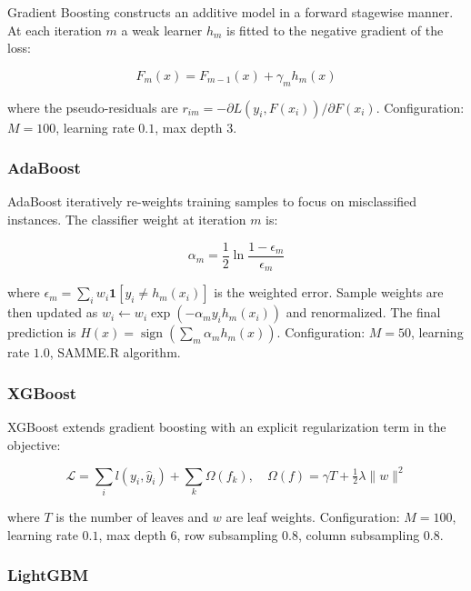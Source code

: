 \documentclass[10pt,letterpaper]{article}
\begin{document}
Gradient Boosting constructs an additive model in a forward stagewise manner. At each iteration $m$
a weak learner $h_m$ is fitted to the negative gradient of the loss:

\begin{equation}
    F_m(x) = F_{m-1}(x) + \gamma_m h_m(x)
    \label{eq:gbm}
\end{equation}

where the pseudo-residuals are $r_{im} = -\partial L(y_i, F(x_i)) / \partial F(x_i)$.
Configuration: $M=100$, learning rate $0.1$, max depth $3$.

\subsubsection{AdaBoost~\cite{freund1997}}

AdaBoost iteratively re-weights training samples to focus on misclassified instances. The
classifier weight at iteration $m$ is:

\begin{equation}
    \alpha_m = \frac{1}{2} \ln \frac{1 - \epsilon_m}{\epsilon_m}
    \label{eq:adaboost_alpha}
\end{equation}

where $\epsilon_m = \sum_i w_i \mathbf{1}[y_i \neq h_m(x_i)]$ is the weighted error.
Sample weights are then updated as $w_i \leftarrow w_i \exp(-\alpha_m y_i h_m(x_i))$ and
renormalized. The final prediction is $H(x) = \operatorname{sign}\!\left(\sum_m \alpha_m h_m(x)\right)$.
Configuration: $M=50$, learning rate $1.0$, SAMME.R algorithm.

\subsubsection{XGBoost~\cite{chen2016}}

XGBoost extends gradient boosting with an explicit regularization term in the objective:

\begin{equation}
    \mathcal{L} = \sum_i l(y_i, \hat{y}_i) + \sum_k \Omega(f_k), \quad
    \Omega(f) = \gamma T + \tfrac{1}{2}\lambda \|w\|^2
    \label{eq:xgboost}
\end{equation}

where $T$ is the number of leaves and $w$ are leaf weights. Configuration: $M=100$,
learning rate $0.1$, max depth $6$, row subsampling $0.8$, column subsampling $0.8$.

\subsubsection{LightGBM~\cite{ke2017}}
\end{document}
